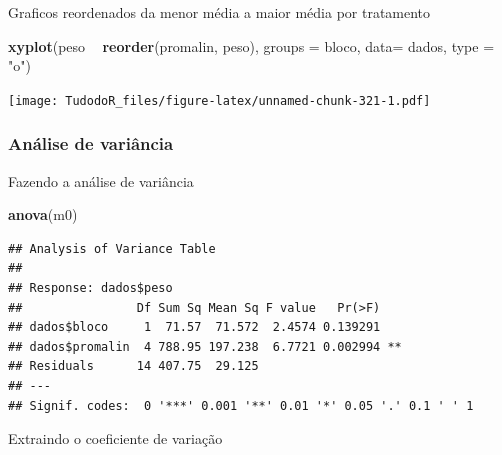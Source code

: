 \documentclass[
]{book}
\newenvironment{Shaded}{\begin{snugshade}}{\end{snugshade}}
\newcommand{\DataTypeTok}[1]{\textcolor[rgb]{0.13,0.29,0.53}{#1}}
\newcommand{\KeywordTok}[1]{\textcolor[rgb]{0.13,0.29,0.53}{\textbf{#1}}}
\newcommand{\NormalTok}[1]{#1}
\newcommand{\OperatorTok}[1]{\textcolor[rgb]{0.81,0.36,0.00}{\textbf{#1}}}
\newcommand{\StringTok}[1]{\textcolor[rgb]{0.31,0.60,0.02}{#1}}
\begin{document}
Graficos reordenados da menor média a maior média por tratamento

\begin{Shaded}
\begin{Highlighting}[]
\KeywordTok{xyplot}\NormalTok{(peso }\OperatorTok{~}\StringTok{ }\KeywordTok{reorder}\NormalTok{(promalin, peso), }
        \DataTypeTok{groups =}\NormalTok{ bloco, }
        \DataTypeTok{data=}\NormalTok{ dados,}
        \DataTypeTok{type =} \StringTok{"o"}\NormalTok{)}
\end{Highlighting}
\end{Shaded}

\texttt{[image: TudodoR\_files/figure-latex/unnamed-chunk-321-1.pdf]}

\hypertarget{anuxe1lise-de-variuxe2ncia-1}{%
\subsubsection{Análise de variância}\label{anuxe1lise-de-variuxe2ncia-1}}

Fazendo a análise de variância

\begin{Shaded}
\end{Shaded}

\begin{Shaded}
\begin{Highlighting}[]
\KeywordTok{anova}\NormalTok{(m0)}
\end{Highlighting}
\end{Shaded}

\begin{verbatim}
## Analysis of Variance Table
## 
## Response: dados$peso
##                Df Sum Sq Mean Sq F value   Pr(>F)   
## dados$bloco     1  71.57  71.572  2.4574 0.139291   
## dados$promalin  4 788.95 197.238  6.7721 0.002994 **
## Residuals      14 407.75  29.125                    
## ---
## Signif. codes:  0 '***' 0.001 '**' 0.01 '*' 0.05 '.' 0.1 ' ' 1
\end{verbatim}

Extraindo o coeficiente de variação
\end{document}
